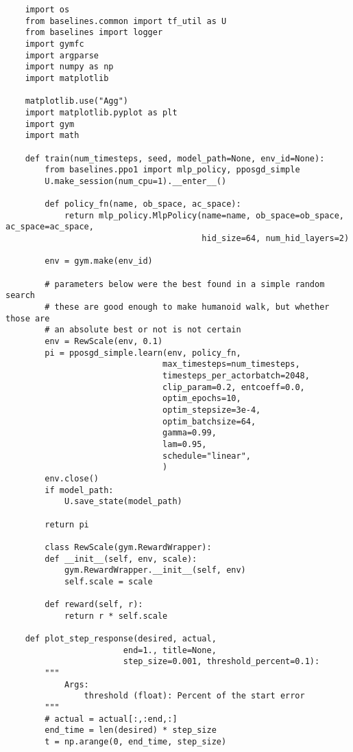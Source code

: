 \begin{verbatim}
    import os
    from baselines.common import tf_util as U
    from baselines import logger
    import gymfc
    import argparse
    import numpy as np
    import matplotlib

    matplotlib.use("Agg")
    import matplotlib.pyplot as plt
    import gym
    import math

    def train(num_timesteps, seed, model_path=None, env_id=None):
        from baselines.ppo1 import mlp_policy, pposgd_simple
        U.make_session(num_cpu=1).__enter__()

        def policy_fn(name, ob_space, ac_space):
            return mlp_policy.MlpPolicy(name=name, ob_space=ob_space, ac_space=ac_space,
                                        hid_size=64, num_hid_layers=2)

        env = gym.make(env_id)

        # parameters below were the best found in a simple random search
        # these are good enough to make humanoid walk, but whether those are
        # an absolute best or not is not certain
        env = RewScale(env, 0.1)
        pi = pposgd_simple.learn(env, policy_fn,
                                max_timesteps=num_timesteps,
                                timesteps_per_actorbatch=2048,
                                clip_param=0.2, entcoeff=0.0,
                                optim_epochs=10,
                                optim_stepsize=3e-4,
                                optim_batchsize=64,
                                gamma=0.99,
                                lam=0.95,
                                schedule="linear",
                                )
        env.close()
        if model_path:
            U.save_state(model_path)

        return pi

        class RewScale(gym.RewardWrapper):
        def __init__(self, env, scale):
            gym.RewardWrapper.__init__(self, env)
            self.scale = scale

        def reward(self, r):
            return r * self.scale

    def plot_step_response(desired, actual,
                        end=1., title=None,
                        step_size=0.001, threshold_percent=0.1):
        """
            Args:
                threshold (float): Percent of the start error
        """
        # actual = actual[:,:end,:]
        end_time = len(desired) * step_size
        t = np.arange(0, end_time, step_size)


\end{verbatim}

